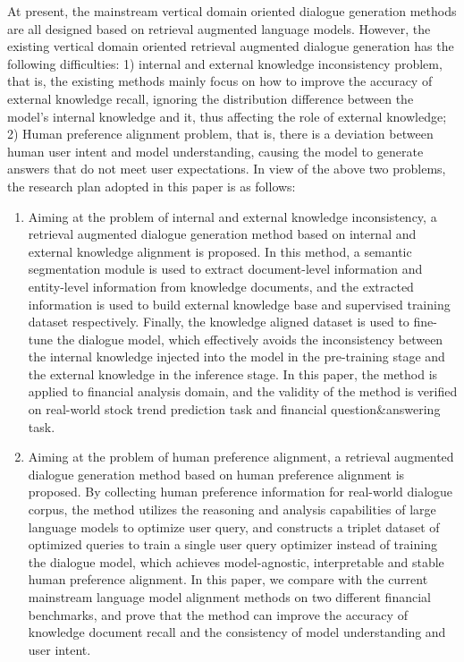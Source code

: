 At present, the mainstream vertical domain oriented dialogue generation methods are all designed based on retrieval augmented language models. However, the existing vertical domain oriented retrieval augmented dialogue generation has the following difficulties: 1) internal and external knowledge inconsistency problem, that is, the existing methods mainly focus on how to improve the accuracy of external knowledge recall, ignoring the distribution difference between the model's internal knowledge and it, thus affecting the role of external knowledge; 2) Human preference alignment problem, that is, there is a deviation between human user intent and model understanding, causing the model to generate answers that do not meet user expectations. In view of the above two problems, the research plan adopted in this paper is as follows:

\begin{enumerate}[topsep = 0 pt, itemsep= 0 pt, parsep=0pt, partopsep=0pt, leftmargin=0pt, itemindent=44pt, labelsep=6pt, listparindent=24pt, label=\arabic*)]
	\item Aiming at the problem of internal and external knowledge inconsistency, a retrieval augmented dialogue generation method based on internal and external knowledge alignment is proposed. In this method, a semantic segmentation module is used to extract document-level information and entity-level information from knowledge documents, and the extracted information is used to build external knowledge base and supervised training dataset respectively. Finally, the knowledge aligned dataset is used to fine-tune the dialogue model, which effectively avoids the inconsistency between the internal knowledge injected into the model in the pre-training stage and the external knowledge in the inference stage. In this paper, the method is applied to financial analysis domain, and the validity of the method is verified on real-world stock trend prediction task and financial question\&answering task.

	\item Aiming at the problem of human preference alignment, a retrieval augmented dialogue generation method based on human preference alignment is proposed. By collecting human preference information for real-world dialogue corpus, the method utilizes the reasoning and analysis capabilities of large language models to optimize user query, and constructs a triplet dataset of optimized queries to train a single user query optimizer instead of training the dialogue model, which achieves model-agnostic, interpretable and stable human preference alignment. In this paper, we compare with the current mainstream language model alignment methods on two different financial benchmarks, and prove that the method can improve the accuracy of knowledge document recall and the consistency of model understanding and user intent.
\end{enumerate}


